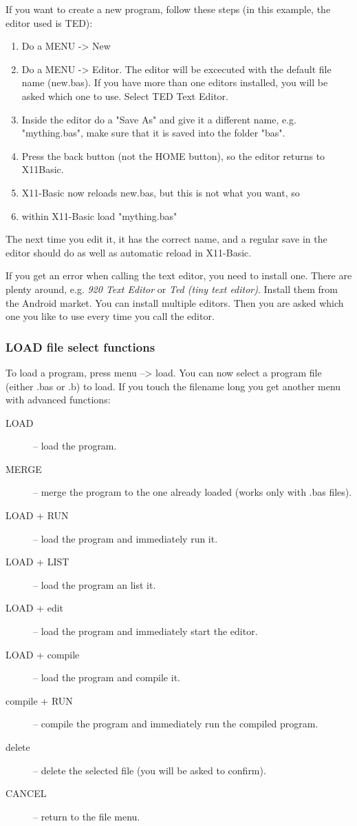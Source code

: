 If you want to create a new program, follow these steps  (in this example, the editor used is TED):

\begin{enumerate}
\item Do a MENU -> New
\item Do a MENU -> Editor. The editor will be excecuted with the default file name (new.bas). 
If you have more than one editors installed, you will be asked which one to use. Select TED Text Editor.
\item Inside the editor do a "Save As" and give it a different name, e.g. "mything.bas", make sure that it is saved 
into the folder "bas".
\item Press the back button (not the HOME button), so the editor returns to X11Basic.
\item X11-Basic now reloads new.bas, but this is not what you want, so
\item within X11-Basic load "mything.bas"
\end{enumerate}
The next time you edit it, it has the correct name, and a regular save in the editor should do
 as well as automatic reload in X11-Basic.

If you get an error when calling the text editor, you need to install one. There
are plenty around, e.g. {\em 920 Text Editor} or {\em Ted (tiny text editor)}.
Install them from the Android market. You can install multiple editors. Then you
are asked which one you like to use every time you call the editor.

\subsubsection*{LOAD file select functions}

To load a program, press menu --> load. You can now select a program file 
(either .bas or .b) to load. If you touch the filename long you get another 
menu with advanced functions: 
\begin{description}
\item[LOAD] -- load the program.
\item[MERGE] -- merge the program to the one already loaded (works only with .bas files).
\item[LOAD + RUN] -- load the program and immediately run it.
\item[LOAD + LIST] -- load the program an list it.
\item[LOAD + edit] -- load the program and immediately start the editor.
\item[LOAD + compile] -- load the program and compile it.
\item[compile + RUN] -- compile the program and immediately run the compiled program.
\item[delete]   -- delete the selected file (you will be asked to confirm).
\item[CANCEL]   -- return to the file menu.
\end{description}

